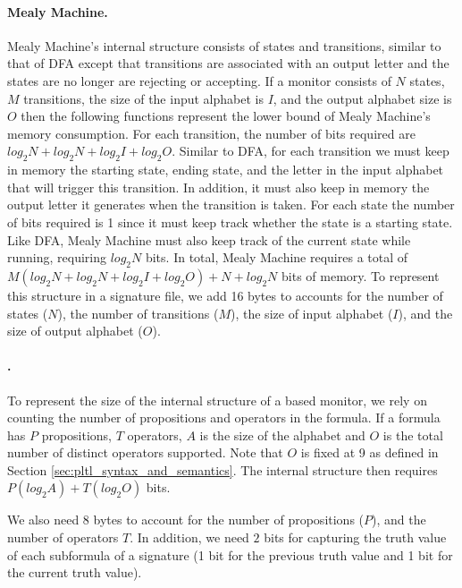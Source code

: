\paragraph{Mealy Machine.} Mealy Machine's internal structure consists
of states and transitions, similar to that of DFA except that
transitions are associated with an output letter and the states
are no longer are rejecting or accepting. If a monitor consists of
$N$ states, $M$ transitions, the size of the input alphabet is $I$,
and the output alphabet size is $O$ then the following functions
represent the lower bound of Mealy Machine's memory consumption.
For each transition, the number of bits required are
$log_2N + log_2N + log_2I + log_2O$. Similar to DFA, for
each transition we must keep in memory the starting state,
ending state, and the letter in the input alphabet that will
trigger this transition. In addition, it must also keep in
memory the output letter it generates when the transition is taken.
For each state the number of bits required is 1 since it must keep
track whether the state is a starting state. Like DFA, Mealy Machine
must also keep track of the current state while running,
requiring $log_2N$ bits. In total, Mealy Machine requires
a total of $M(log_2N + log_2N + log_2I + log_2O) + N + log_2N$ bits
of memory. To represent this structure in a signature file,
we add 16 bytes to accounts for the number of states ($N$),
the number of transitions ($M$), the size of input alphabet ($I$),
and the size of output alphabet ($O$).


\paragraph{\pltl.} To represent the size of the internal structure of a \pltl based monitor,
we rely on counting the number of propositions and operators in the formula.
If a formula has $P$ propositions, $T$ operators, $A$ is the size of the alphabet
and $O$ is the total number of distinct operators supported. Note that $O$ is
fixed at 9 as defined in Section \ref{sec:pltl_syntax_and_semantics}. The internal
structure then requires $P(log_2A) + T(log_2O)$ bits.

We also need 8 bytes to account
for the number of propositions ($P$), and the number of operators $T$.
In addition, we need $2$ bits for capturing the truth value of each subformula
of a signature (1 bit for the previous truth value and 1 bit for the current
truth value).


